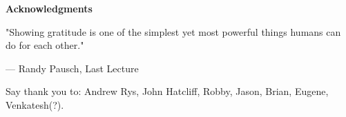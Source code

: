 
\newpage
\vspace*{0.9cm}
\begin{center}
{\bf \Huge Acknowledgments}
\end{center}

\setlength{\baselineskip}{0.8cm}


\setlength{}
\setlength\epigraphrule{0pt}
\makeatletter
{}
\makeatother

\epigraph{"Showing gratitude is one of the simplest yet most powerful things humans can do for each other."}{--- \textup{Randy Pausch}, Last Lecture}



Say thank you to: Andrew Rys, John Hatcliff, Robby, Jason, Brian, Eugene, Venkatesh(?).